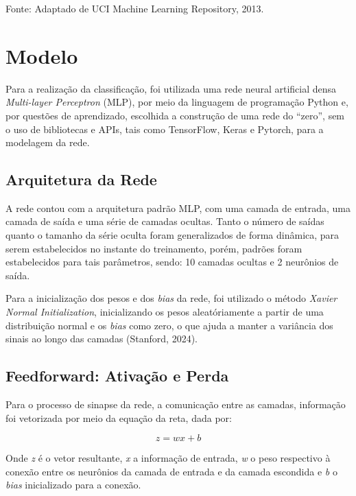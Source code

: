 \documentclass[12pt]{article}
\begin{document}
\begin{center}
    Fonte: Adaptado de UCI Machine Learning Repository, 2013.
\end{center}


\section{Modelo}

Para a realização da classificação, foi utilizada uma rede neural artificial densa \textit{Multi-layer Perceptron} (MLP), por meio da linguagem de programação Python e, por questões de aprendizado,  escolhida a construção de uma rede do “zero”, sem o uso de bibliotecas e APIs, tais como TensorFlow, Keras e Pytorch, para a modelagem da rede.


\subsection{Arquitetura da Rede}

A rede contou com a arquitetura padrão MLP, com uma camada de entrada, uma camada de saída e uma série de camadas ocultas. Tanto o número de saídas quanto o tamanho da série oculta foram generalizados de forma dinâmica, para serem estabelecidos no instante do treinamento,  porém, padrões foram estabelecidos para tais parâmetros, sendo: 10 camadas ocultas e 2 neurônios de saída.

Para a inicialização dos pesos e dos \textit{bias} da rede, foi utilizado o método \textit{Xavier Normal Initialization}, inicializando os pesos aleatóriamente a partir de uma distribuição normal e os \textit{bias} como zero, o que ajuda a manter a variância dos sinais ao longo das camadas (Stanford, 2024).


\subsection{Feedforward: Ativação e Perda}

Para o processo de sinapse da rede, a comunicação entre as camadas, informação foi vetorizada por meio da equação da reta, dada por:

\begin{equation}
    z = wx + b
\end{equation}

Onde \textit{z} é o vetor resultante, \textit{x} a informação de entrada, \textit{w} o peso respectivo à conexão entre os neurônios da camada de entrada e da camada escondida e \textit{b} o \textit{bias} inicializado para a conexão. 
\end{document}
